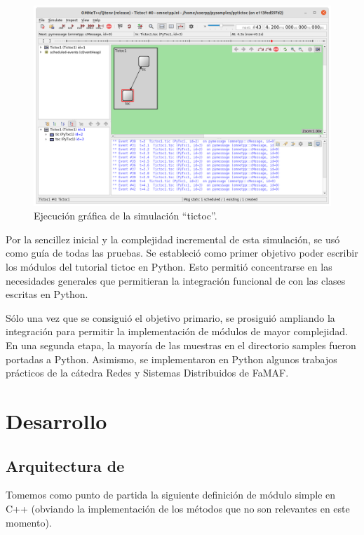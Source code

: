 \documentclass[]{article}
\begin{document}
\begin{figure}[h]
\caption{Ejecución gráfica de la simulación ``tictoc''.}
\label{fig:tictoc}
\centering
\includegraphics[width=\textwidth]{tictoc}
\end{figure}

Por la sencillez inicial y la complejidad incremental de esta simulación, se
usó como guía de todas las pruebas. Se estableció como primer objetivo poder
escribir los módulos del tutorial tictoc en Python. Esto permitió concentrarse
en las necesidades generales que permitieran la integración funcional de
\omnetpp{} con las clases escritas en Python.

Sólo una vez que se consiguió el objetivo primario, se prosiguió ampliando la
integración para permitir la implementación de módulos de mayor complejidad. En
una segunda etapa, la mayoría de las muestras en el directorio samples fueron
portadas a Python. Asimismo, se implementaron en Python algunos trabajos
prácticos de la cátedra Redes y Sistemas Distribuidos de FaMAF.

\section{Desarrollo}\label{sec:des}
\subsection{Arquitectura de \omnetpp{}}

Tomemos como punto de partida la siguiente definición de módulo simple en C++
(obviando la implementación de los métodos que no son relevantes en este
momento).

\inputminted{c++}{codelistings/txc1.cc}
\end{document}
